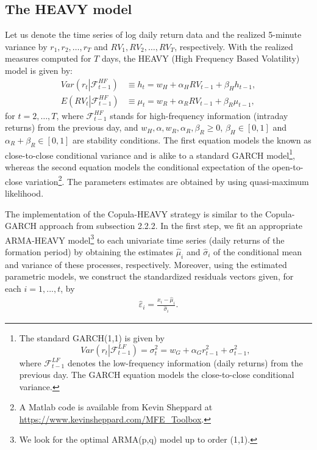 \documentclass[a4paper,12pt]{report}
\begin{document}
\vspace{0.6cm}

\subsection{The HEAVY model}

Let us denote the time series of log daily return data and the realized 5-minute variance by $r_{1},r_{2},\ldots,r_{T}$ and $RV_{1},RV_{2},\ldots,RV_{T}$, respectively. With the realized measures computed for $T$ days, the HEAVY (High Frequency Based Volatility) model \citep{ss10} is given by:
\begin{align}
Var\left(r_{t}\left\vert\mathcal{F}_{t-1}^{HF}\right. \right)
&\equiv h_{t}=w_{H}+\alpha _{H}RV_{t-1}+\beta _{H}h_{t-1},  \label{CC} \\
E\left(RV_{t}\left\vert\mathcal{F}_{t-1}^{HF}\right. \right)  &\equiv \mu_{t}=w_{R}+\alpha_{R}RV_{t-1}+\beta_{R}\mu_{t-1},  \label{OC}
\end{align}
for $t=2,\ldots,T$, where $\mathcal{F}_{t-1}^{HF}$ stands for high-frequency information (intraday returns) from the previous day, and $w_{H},\alpha,w_{R},\alpha_{R},\beta_{R}\geq 0$, $\beta _{H}\in[0,1]$ and $\alpha_{R}+\beta_{R}\in[0,1]$ are stability conditions. The first equation models the known as close-to-close conditional variance and is alike to a standard GARCH model\footnote{The standard GARCH(1,1) is given by
	\begin{equation}
		Var\left(r_{t}\left\vert \mathcal{F}_{t-1}^{LF}\right. \right) =\sigma
	_{t}^{2}=w_{G}+\alpha_{G}r_{t-1}^{2}+\sigma_{t-1}^{2},
	\label{GCC}
	\end{equation}
	where $\mathcal{F}_{t-1}^{LF}$ denotes the low-frequency information (daily returns) from the previous day. The GARCH equation models the close-to-close conditional variance.}, whereas the second equation models the conditional expectation of the open-to-close variation\footnote{A Matlab code is available from Kevin Sheppard at \url{https://www.kevinsheppard.com/MFE_Toolbox}.}. The parameters estimates are obtained by using quasi-maximum likelihood.

The implementation of the Copula-HEAVY strategy is similar to the Copula-GARCH approach from subsection 2.2.2. In the first step, we fit an appropriate ARMA-HEAVY model\footnote{We look for the optimal ARMA(p,q) model up to order (1,1).} to each univariate time series (daily returns of the formation period) by obtaining the estimates $\widehat{\mu }_{i}$ and $\widehat{\sigma }_{i}$ of the conditional mean and variance of these processes, respectively. Moreover, using the estimated parametric models, we construct the standardized residuals vectors given, for each $i=1,...,t$, by
\begin{equation}
\begin{aligned}
\widehat{\varepsilon }_{i}=\frac{x_{i}-\widehat{\mu }_{i}}{\widehat{\sigma }_{i}}.
\end{aligned}
\label{eq:eq32}
\end{equation}
\end{document}
